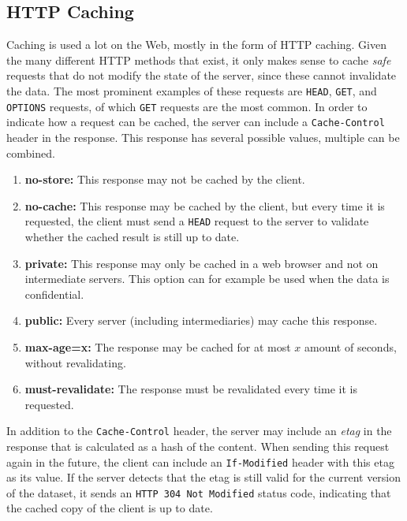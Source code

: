 \subsection{HTTP Caching}
Caching is used a lot on the Web, mostly in the form of HTTP caching. Given the many different HTTP methods that exist, it only makes sense to cache \emph{safe} requests that do not modify the state of the server, since these cannot invalidate the data. The most prominent examples of these requests are \texttt{HEAD}, \texttt{GET}, and \texttt{OPTIONS} requests, of which \texttt{GET} requests are the most common. In order to indicate how a request can be cached, the server can include a \texttt{Cache-Control} header in the response. This response has several possible values, multiple can be combined.

\begin{enumerate}
    \item \textbf{no-store:} This response may not be cached by the client.
    
    \item \textbf{no-cache:} This response may be cached by the client, but every time it is requested, the client must send a \texttt{HEAD} request to the server to validate whether the cached result is still up to date.
    
    \item \textbf{private:} This response may only be cached in a web browser and not on intermediate servers. This option can for example be used when the data is confidential.
    
    \item \textbf{public:} Every server (including intermediaries) may cache this response.
    
    \item \textbf{max-age=x:} The response may be cached for at most $x$ amount of seconds, without revalidating.
    
    \item \textbf{must-revalidate:} The response must be revalidated every time it is requested.
\end{enumerate}

\noindent In addition to the \texttt{Cache-Control} header, the server may include an \emph{etag} in the response that is calculated as a hash of the content. When sending this request again in the future, the client can include an \texttt{If-Modified} header with this etag as its value. If the server detects that the etag is still valid for the current version of the dataset, it sends an \texttt{HTTP 304 Not Modified} status code, indicating that the cached copy of the client is up to date.\\

